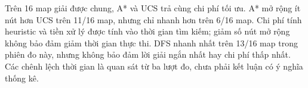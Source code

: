 Trên 16 map giải được chung, A* và UCS trả cùng chi phí tối ưu. A* mở rộng ít nút hơn UCS trên 11/16 map, nhưng chỉ nhanh hơn trên 6/16 map. Chi phí tính heuristic và tiền xử lý được tính vào thời gian tìm kiếm; giảm số nút mở rộng không bảo đảm giảm thời gian thực thi. DFS nhanh nhất trên 13/16 map trong phiên đo này, nhưng không bảo đảm lời giải ngắn nhất hay chi phí thấp nhất. Các chênh lệch thời gian là quan sát từ ba lượt đo, chưa phải kết luận có ý nghĩa thống kê.
